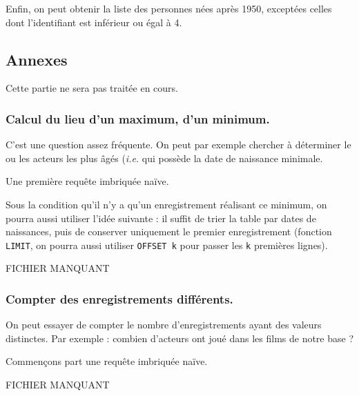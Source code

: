 Enfin, on peut obtenir la liste des personnes nées après 1950, exceptées celles dont l'identifiant est inférieur ou égal à 4. 


\begin{center}
\end{center}

\subsection{Annexes}

Cette partie ne sera pas traitée en cours.

\subsubsection{Calcul du lieu d'un maximum, d'un minimum.}
C'est une question assez fréquente. On peut par exemple chercher à déterminer le ou les acteurs les plus âgés (\emph{i.e.} qui possède la date de naissance minimale. 

Une première requête imbriquée naïve. 


\begin{center}
\end{center}

Sous la condition qu'il n'y a qu'un enregistrement réalisant ce minimum, on pourra aussi utiliser l'idée suivante : il suffit de trier la table par dates de naissances, puis de conserver uniquement le premier enregistrement (fonction \texttt{LIMIT}, on pourra aussi utiliser  \texttt{OFFSET k} pour passer les \texttt{k} premières lignes).

\begin{center}
FICHIER MANQUANT %
\end{center}

\subsubsection{Compter des enregistrements différents.}

On peut essayer de compter le nombre d'enregistrements ayant des valeurs distinctes. Par exemple : combien d'acteurs ont joué dans les films de notre base ? 

Commençons part une requête imbriquée naïve. 

\begin{center}
FICHIER MANQUANT %
\end{center}

